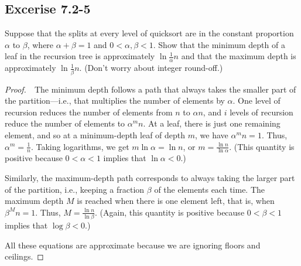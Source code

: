 \documentclass{article}
\begin{document}
\newpage 
%
\subsection*{Excerise 7.2-5}
Suppose that the splits at every level of quicksort are in the constant proportion $\alpha$ to $\beta$, where $\alpha + \beta = 1$ and $0 < \alpha, \beta < 1$. 
Show that the minimum depth of a leaf in the recursion tree is approximately $\ln \frac{1}{\alpha} n$ and that the maximum depth is approximately $\ln \frac{1}{\beta} n$. (Don't worry about integer round-off.)
\begin{proof}
    $ $\newline
    $ $\newline
    The minimum depth follows a path that always takes the smaller part of the partition—i.e., 
    that multiplies the number of elements by $\alpha$. 
    One level of recursion reduces the number of elements from $n$ to $\alpha n$, 
    and $i$ levels of recursion reduce the number of elements to $\alpha^m n$. 
    At a leaf, there is just one remaining element, 
    and so at a minimum-depth leaf of depth $m$, we have $\alpha^m n = 1$. 
    Thus, $\alpha^m = \frac{1}{n}$. 
    Taking logarithms, we get $m \ln \alpha = \ln n$, or $m = \frac{\ln n}{\ln \alpha}$. 
    (This quantity is positive because $0 < \alpha < 1$ implies that $\ln \alpha < 0$.)
    
    Similarly, the maximum-depth path corresponds to always taking the larger part of the partition, 
    i.e., keeping a fraction $\beta$ of the elements each time. 
    The maximum depth $M$ is reached when there is one element left, 
    that is, when $\beta^M n = 1$. 
    Thus, $M = \frac{\ln n}{\ln \beta}$. 
    (Again, this quantity is positive because $0 < \beta < 1$ implies that $\log \beta < 0$.)
    
    All these equations are approximate because we are ignoring floors and ceilings.
\end{proof}
\end{document}
